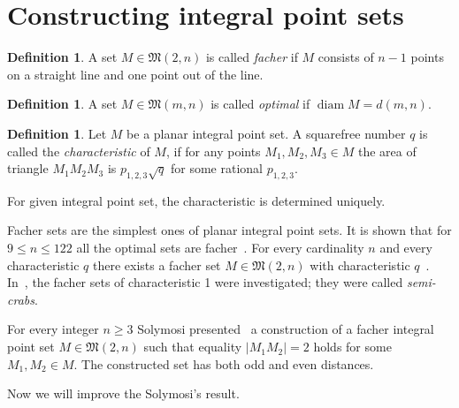\documentclass[a4paper,14pt]{article} %
\theoremstyle{plain}
\theoremstyle{definition}
\newtheorem{definition}[theorem]{Definition}
\begin{document}
\section{Constructing integral point sets}

\begin{definition}
	A set $M\in\mathfrak{M}(2,n)$ is called \textit{facher}
	if $M$ consists of $n-1$ points on a straight line
	and one point out of the line.
\end{definition}

\begin{definition}
	A set $M\in\mathfrak{M}(m,n)$ is called \textit{optimal}
	if $\operatorname{diam}M=d(m,n)$.
\end{definition}

\begin{definition}
	\cite{kurz2005characteristic}
	Let $M$ be a planar integral point set.
	A squarefree number $q$ is called the \textit{characteristic} of $M$,
	if for any points $M_1, M_2, M_3 \in M$ the area of triangle $M_1 M_2 M_3$
	is $p_{1,2,3}\sqrt{q}$ for some rational $p_{1,2,3}$.
\end{definition}
For given integral point set, the characteristic is determined uniquely.

Facher sets are the simplest ones of planar integral point sets.
It is shown that for $9\leq n \leq 122$ all the optimal sets are facher~\cite{kurz2008minimum}.
For every cardinality $n$ and every characteristic $q$
there exists a facher set $M\in\mathfrak{M}(2,n)$ with characteristic $q$~\cite[Theorem 5]{our-vmmsh-2018}.
In~\cite{antonov2008maximal}, the facher sets of characteristic 1 were investigated; they were called \textit{semi-crabs}.

For every integer $n\geq 3$ Solymosi presented~\cite{solymosi2003note} a construction of a facher integral point set
$M\in\mathfrak{M}(2,n)$
such that equality $|M_1 M_2| = 2$ holds for some $M_1, M_2 \in M$.
The constructed set has both odd and even distances.

Now we will improve the Solymosi's result.
\end{document}
